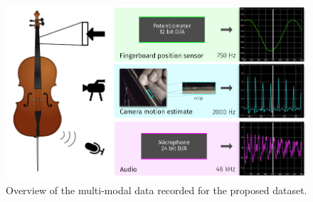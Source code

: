 \begin{figure}[h]
  \centering
  \includegraphics[width=\textwidth]{Chapters/04_Data/figures/teaser.pdf}
  \caption{Overview of the multi-modal data recorded for the proposed dataset.}
\label{fig:teaser}
\end{figure}

